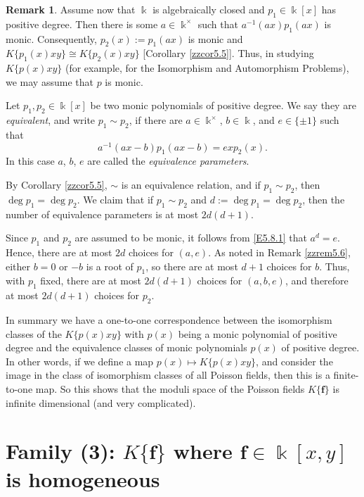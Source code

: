 \documentclass[12pt]{amsart}
\theoremstyle{plain}
\numberwithin{theorem}{section}
\numberwithin{equation}{theorem}
\theoremstyle{definition}
\newtheorem{remark}[theorem]{Remark}
\newcommand \bff {{\mathbf{f}}}
\newcommand \kx {\Bbbk^\times}
\begin{document}
\begin{remark}
\label{zzrem5.8}
Assume now that $\Bbbk$ is algebraically closed 
and $p_1 \in \Bbbk[x]$ has positive degree. Then there is 
some $a \in \kx$ such that $a^{-1} (ax) p_1(ax)$ is monic.
Consequently, $p_2(x):=p_1(ax)$ is monic and $K\{p_1(x)xy\} 
\cong K\{p_2(x)xy\}$ [Corollary \ref{zzcor5.5}]. Thus, in 
studying $K\{p(x)xy\}$ (for example, for the Isomorphism 
and Automorphism Problems), we may assume that $p$ is monic.

Let $p_1,p_2 \in \Bbbk[x]$ be two monic polynomials of 
positive degree. We say they are \emph{equivalent}, and 
write $p_1\sim p_2$, if there are $a\in \Bbbk^{\times}$, $b\in \Bbbk$, and $e \in \{\pm1\}$ such that 
\begin{equation}
\label{E5.8.1}\tag{E5.8.1}
a^{-1}(ax-b)p_1(ax-b)=e xp_2(x).
\end{equation}
In this case $a$, $b$, $e$ are called the \emph{equivalence parameters}.

By Corollary \ref{zzcor5.5}, $\sim$ is an equivalence 
relation, and if $p_1\sim p_2$, then $\deg p_1 = \deg p_2$.
We claim that if $p_1\sim p_2$ and $d:= \deg p_1 = \deg p_2$, then the number of equivalence parameters is at most $2d(d+1)$.

Since $p_1$ and $p_2$ are assumed to be monic, it follows from \eqref{E5.8.1} that $a^d = e$.  Hence, there are at most 
$2d$ choices for $(a,e)$.  As noted in Remark \ref{zzrem5.6}, either $b=0$ or $-b$ is a root of $p_1$, so there are at most $d+1$ choices for $b$.  Thus, with $p_1$ fixed, there are at 
most $2d(d+1)$ choices for $(a,b,e)$, and therefore at most 
$2d(d+1)$ choices for $p_2$.

In summary we have a one-to-one correspondence between
the isomorphism classes of the $K\{p(x)xy\}$ with $p(x)$ 
being a monic polynomial of positive degree and 
the equivalence classes of monic polynomials $p(x)$ of 
positive degree. In other words, if we define a map 
$p(x)\mapsto K\{p(x)xy\}$, and consider the image in the 
class of isomorphism classes of all Poisson fields, then 
this is a finite-to-one map. So this shows that 
the moduli space of the Poisson fields $K\{\bff\}$ is infinite dimensional
(and very complicated).
\end{remark}


\section{Family (3): $K\{\bff\}$ where $\bff\in 
\Bbbk[x,y]$ is homogeneous}
\label{zzsec6}
\end{document}
